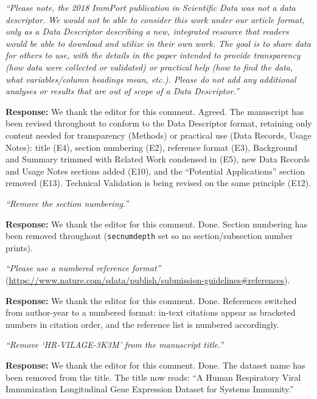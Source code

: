 \documentclass[11pt]{article}
\newcommand{\origcomment}[1]{\textit{``#1''}}
\newcommand{\filledresponse}[1]{%
  \par\medskip\noindent\textbf{Response:} #1\par
  \vspace{0.4cm}%
  \par\noindent\hrulefill\par\bigskip
}
\begin{document}
\begin{commentlist}

\item[E1.] \origcomment{Please note, the 2018 ImmPort publication in Scientific Data was not a
data descriptor. We would not be able to consider this work under our article format, only as a
Data Descriptor describing a new, integrated resource that readers would be able to download and
utilize in their own work. The goal is to share data for others to use, with the details in the
paper intended to provide transparency (how data were collected or validated) or practical help
(how to find the data, what variables/column headings mean, etc.). Please do not add any
additional analyses or results that are out of scope of a Data Descriptor.}
\filledresponse{We thank the editor for this comment. Agreed. The manuscript has been revised throughout to conform to the Data
Descriptor format, retaining only content needed for transparency (Methods) or practical use (Data
Records, Usage Notes): title (E4), section numbering (E2), reference format (E3), Background and
Summary trimmed with Related Work condensed in (E5), new Data Records and Usage Notes sections
added (E10), and the ``Potential Applications'' section removed (E13). Technical Validation is
being revised on the same principle (E12).}

\item[E2.] \origcomment{Remove the section numbering.}
\filledresponse{We thank the editor for this comment. Done. Section numbering has been removed throughout (\texttt{secnumdepth} set so
no section/subsection number prints).}

\item[E3.] \origcomment{Please use a numbered reference format}
(\url{https://www.nature.com/sdata/publish/submission-guidelines#references}).
\filledresponse{We thank the editor for this comment. Done. References switched from author-year to a numbered format: in-text citations
appear as bracketed numbers in citation order, and the reference list is numbered accordingly.}

\item[E4.] \origcomment{Remove `HR-VILAGE-3K3M' from the manuscript title.}
\filledresponse{We thank the editor for this comment. Done. The dataset name has been removed from the title. The title now reads:
``A Human Respiratory Viral Immunization Longitudinal Gene Expression Dataset for Systems
Immunity.''}


\end{commentlist}
\end{document}
